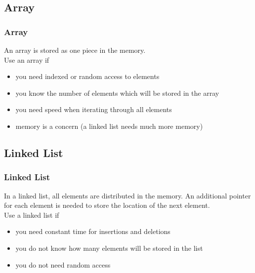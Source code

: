 \subsection{Array}
\begin{frame}[fragile]
\frametitle{Array}
An array is stored as one piece in the memory.\\
Use an array if
\begin{itemize}
\item you need indexed or random access to elements
\item you know the number of elements which will be stored in the array
\item you need speed when iterating through all elements
\item memory is a concern (a linked list needs much more memory)
\end{itemize}
\end{frame}

\subsection{Linked List}
\begin{frame}[fragile]
\frametitle{Linked List}
In a linked list, all elements are distributed in the memory. An additional pointer
for each element is needed to store the location of the next element.\\
Use a linked list if
\begin{itemize}
\item you need constant time for insertions and deletions
\item you do not know how many elements will be stored in the list
\item you do not need random access
\end{itemize}
\end{frame}

